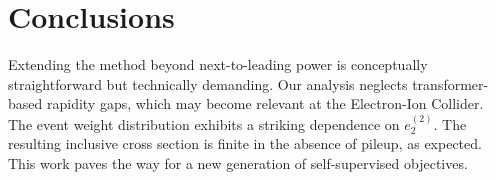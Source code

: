 \section{Conclusions}\label{sec:conclusions}

Extending the method beyond next-to-leading power is conceptually
straightforward but technically demanding. Our analysis neglects
transformer-based rapidity gaps, which may become relevant at the
Electron-Ion Collider. The event weight distribution exhibits a striking
dependence on $e_2^{(2)}$. The resulting inclusive cross section is
finite in the absence of pileup, as expected. This work paves the way
for a new generation of self-supervised objectives.

